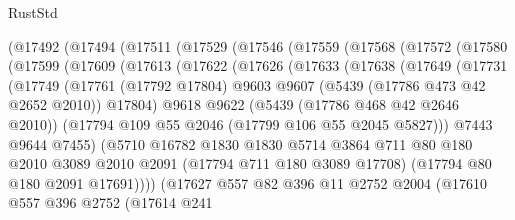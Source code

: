 \begin{lexlean}{RustStd}
\begin{coremodule}
{\begin{coremodule}
{{{{{{{{{{{{{{{{{{{{{{{{{{{{{{{    (@17492
      (@17494
        (@17511
          (@17529
            (@17546
              (@17559
                (@17568
                  (@17572
                    (@17580
                      (@17599
                        (@17609
                          (@17613
                            (@17622
                              (@17626
                                (@17633
                                  (@17638
                                    (@17649
                                      (@17731
                                        (@17749
                                          (@17761
                                            (@17792 @17804)
                                            @9603
                                            @9607
                                            (@5439 (@17786 @473 @42 @2652 @2010))
                                            @17804)
                                          @9618
                                          @9622
                                          (@5439 (@17786 @468 @42 @2646 @2010))
                                          (@17794 @109 @55 @2046 (@17799 @106 @55 @2045 @5827)))
                                        @7443
                                        @9644
                                        @7455)
                                      (@5710
                                        @16782
                                        @1830
                                        @1830
                                        @5714
                                        @3864
                                        @711
                                        @80
                                        @180
                                        @2010
                                        @3089
                                        @2010
                                        @2091
                                        (@17794 @711 @180 @3089 @17708)
                                        (@17794 @80 @180 @2091 @17691))))
                                  (@17627
                                    @557
                                    @82
                                    @396
                                    @11
                                    @2752
                                    @2004
                                    (@17610
                                      @557
                                      @396
                                      @2752
                                      (@17614
                                        @241
}}}}}}}}}}}}}}}}}}}}}}}}}}}}}}}
\end{coremodule}}
\end{coremodule}
\end{lexlean}
